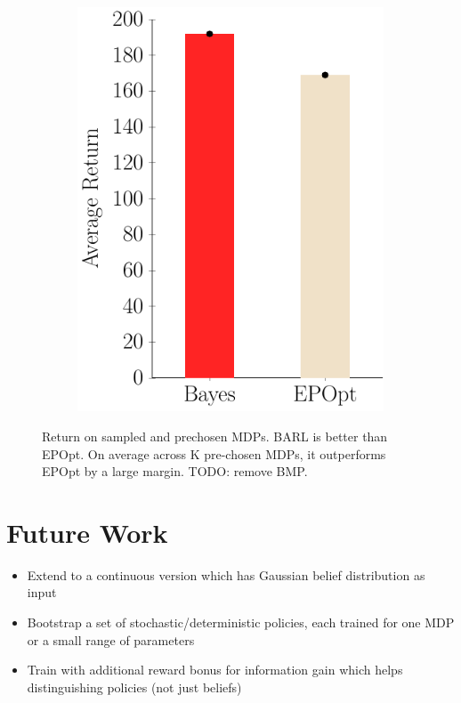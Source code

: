 \documentclass{article}
\begin{document}
\begin{figure}[t!]
\begin{centering}
\begin{subfigure}[b]{0.235\columnwidth}
\includegraphics[width=\linewidth]{figs/cheetah_average.pdf}
\end{subfigure}
\caption{Return on sampled and prechosen MDPs. BARL is better than EPOpt. On average across K pre-chosen MDPs, it outperforms EPOpt by a large margin. TODO: remove BMP.}
\end{centering}
\end{figure}



\section{Future Work}

\begin{itemize}
    \item Extend to a continuous version which has Gaussian belief distribution as input
    \item Bootstrap a set of stochastic/deterministic policies, each trained for one MDP or a small range of parameters
    \item Train with additional reward bonus for information gain which helps distinguishing policies (not just beliefs)
\end{itemize}
\end{document}
